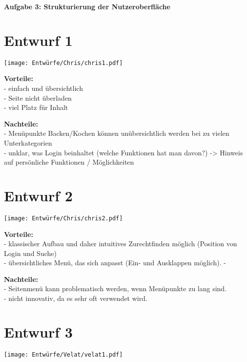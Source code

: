 \documentclass[parskip,10pt,abstracton]{scrartcl}
\renewcommand*{\maketitle}{%
	{\centering\LARGE\sffamily\bfseries Aufgabe 3: Strukturierung der Nutzeroberfläche \par}
	\vspace{3em}
}
\begin{document}
\maketitle

\section*{Entwurf 1} %

\texttt{[image: Entwürfe/Chris/chris1.pdf]}


\textbf{Vorteile:} \\
- einfach und übersichtlich\\
- Seite nicht überladen\\
- viel Platz für Inhalt

\textbf{Nachteile:} \\
- Menüpunkte Backen/Kochen können unübersichtlich werden bei zu vielen Unterkategorien\\
- unklar, was Login beinhaltet (welche Funktionen hat man davon?) -> Hinweis auf persönliche Funktionen / Möglichkeiten

\section*{Entwurf 2} %

\texttt{[image: Entwürfe/Chris/chris2.pdf]}

\textbf{Vorteile:}\\
- klassischer Aufbau und daher intuitives Zurechtfinden möglich (Position von Login und Suche) \\
- übersichtliches Menü, das sich anpasst (Ein- und Ausklappen möglich).
-

\textbf{Nachteile:}\\
- Seitenmenü kann problematisch werden, wenn Menüpunkte zu lang sind.\\
- nicht innovativ, da es sehr oft verwendet wird.


\section*{Entwurf 3} %

\texttt{[image: Entwürfe/Velat/velat1.pdf]}
\end{document}
